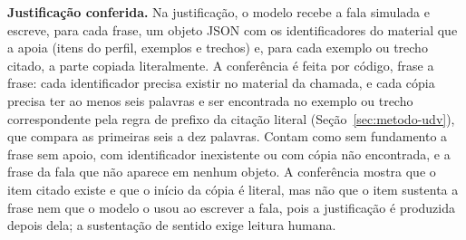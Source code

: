 \textbf{Justificação conferida.} Na justificação, o modelo recebe a fala simulada e escreve, para
cada frase, um objeto JSON com os identificadores do material que a apoia (itens do perfil, exemplos
e trechos) e, para cada exemplo ou trecho citado, a parte copiada literalmente. A conferência é feita
por código, frase a frase: cada identificador precisa existir no material da chamada, e cada cópia
precisa ter ao menos seis palavras e ser encontrada no exemplo ou trecho correspondente pela regra de
prefixo da citação literal (Seção~\ref{sec:metodo-udv}), que compara as primeiras seis a dez
palavras. Contam como sem fundamento a frase sem apoio, com identificador inexistente ou com cópia
não encontrada, e a frase da fala que não aparece em nenhum objeto. A conferência mostra que o item
citado existe e que o início da cópia é literal, mas não que o item sustenta a frase nem que o modelo
o usou ao escrever a fala, pois a justificação é produzida depois dela; a sustentação de sentido
exige leitura humana.
